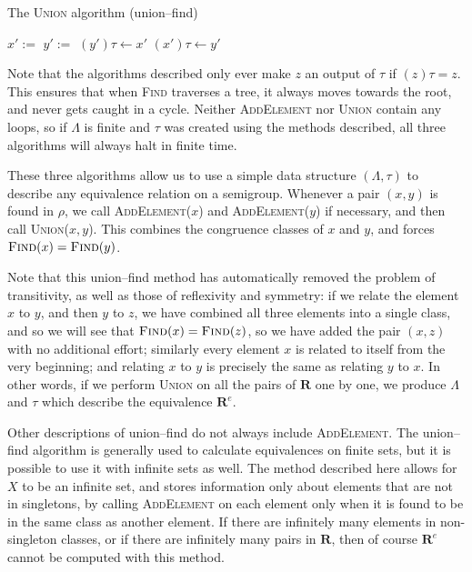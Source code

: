 \begin{algorithm}
\caption{The \textsc{Union} algorithm (union--find)}
\label{alg:uf-union}
  \begin{algorithmic}[1]
      \State $x' := $ 
      \State $y' := $ 
        \State $(y')\tau \gets x'$
        \State $(x')\tau \gets y'$
      \EndIf
    \EndProcedure
  \end{algorithmic}
\end{algorithm}

Note that the algorithms described only ever make $z$ an output of $\tau$ if
$(z)\tau = z$.  This ensures that when \textsc{Find} traverses a tree, it always
moves towards the root, and never gets caught in a cycle.  Neither
\textsc{AddElement} nor \textsc{Union} contain any loops, so if $\Lambda$ is
finite and $\tau$ was created using the methods described, all three algorithms
will always halt in finite time.

These three algorithms allow us to use a simple data structure $(\Lambda, \tau)$ to describe any
equivalence relation on a semigroup.  Whenever a pair $(x,y)$ is found in
$\rho$, we call \textsc{AddElement($x$)} and \textsc{AddElement($y$)} if
necessary, and then call \textsc{Union($x,y$)}.
This combines the congruence classes of $x$ and $y$, and forces
$\textsc{Find}(x) = \textsc{Find}(y)$.

Note that this union--find method has automatically removed the problem of
transitivity, as well as those of reflexivity and symmetry: if we relate the
element $x$ to $y$, and then $y$ to $z$, we have combined all three elements
into a single class, and so we will see that
$\textsc{Find}(x) = \textsc{Find}(z)$, so we have added the pair $(x,z)$ with no
additional effort; similarly every element $x$ is related to itself from the
very beginning; and relating $x$ to $y$ is precisely the same as relating $y$ to
$x$.  In other words, if we perform \textsc{Union} on all the pairs of
$\mathbf{R}$ one by one, we produce $\Lambda$ and $\tau$ which describe the
equivalence $\mathbf{R}^e$.

Other descriptions of union--find do not always include \textsc{AddElement}.  The
union--find algorithm is generally used to calculate equivalences on finite sets,
but it is possible to use it with infinite sets as well.  The method described
here allows for $X$ to be an infinite set, and stores information only about
elements that are not in singletons, by calling \textsc{AddElement} on each
element only when it is found to be in the same class as another element.  If
there are infinitely many elements in non-singleton classes, or if there are
infinitely many pairs in $\mathbf{R}$, then of course $\mathbf{R}^e$ cannot be
computed with this method.

